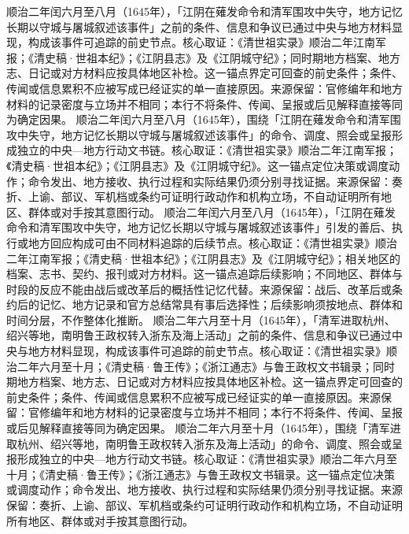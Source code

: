 顺治二年闰六月至八月（1645年），「江阴在薙发命令和清军围攻中失守，地方记忆长期以守城与屠城叙述该事件」之前的条件、信息和争议已通过中央与地方材料显现，构成该事件可追踪的前史节点。核心取证：《清世祖实录》顺治二年江南军报；《清史稿·世祖本纪》；《江阴县志》及《江阴城守纪》；同时期地方档案、地方志、日记或对方材料应按具体地区补检。这一锚点界定可回查的前史条件；条件、传闻或信息累积不应被写成已经证实的单一直接原因。来源保留：官修编年和地方材料的记录密度与立场并不相同；本行不将条件、传闻、呈报或后见解释直接等同为确定因果。
顺治二年闰六月至八月（1645年），围绕「江阴在薙发命令和清军围攻中失守，地方记忆长期以守城与屠城叙述该事件」的命令、调度、照会或呈报形成独立的中央—地方行动文书链。核心取证：《清世祖实录》顺治二年江南军报；《清史稿·世祖本纪》；《江阴县志》及《江阴城守纪》。这一锚点定位决策或调度动作；命令发出、地方接收、执行过程和实际结果仍须分别寻找证据。来源保留：奏折、上谕、部议、军机档或条约可证明行政动作和机构立场，不自动证明所有地区、群体或对手按其意图行动。
顺治二年闰六月至八月（1645年），「江阴在薙发命令和清军围攻中失守，地方记忆长期以守城与屠城叙述该事件」引发的善后、执行或地方回应构成可由不同材料追踪的后续节点。核心取证：《清世祖实录》顺治二年江南军报；《清史稿·世祖本纪》；《江阴县志》及《江阴城守纪》；相关地区的档案、志书、契约、报刊或对方材料。这一锚点追踪后续影响；不同地区、群体与时段的反应不能由战后或改革后的概括性记忆代替。来源保留：战后、改革后或条约后的记忆、地方记录和官方总结常具有事后选择性；后续影响须按地点、群体和时间分层，不作整体化推断。
顺治二年六月至十月（1645年），「清军进取杭州、绍兴等地，南明鲁王政权转入浙东及海上活动」之前的条件、信息和争议已通过中央与地方材料显现，构成该事件可追踪的前史节点。核心取证：《清世祖实录》顺治二年六月至十月；《清史稿·鲁王传》；《浙江通志》与鲁王政权文书辑录；同时期地方档案、地方志、日记或对方材料应按具体地区补检。这一锚点界定可回查的前史条件；条件、传闻或信息累积不应被写成已经证实的单一直接原因。来源保留：官修编年和地方材料的记录密度与立场并不相同；本行不将条件、传闻、呈报或后见解释直接等同为确定因果。
顺治二年六月至十月（1645年），围绕「清军进取杭州、绍兴等地，南明鲁王政权转入浙东及海上活动」的命令、调度、照会或呈报形成独立的中央—地方行动文书链。核心取证：《清世祖实录》顺治二年六月至十月；《清史稿·鲁王传》；《浙江通志》与鲁王政权文书辑录。这一锚点定位决策或调度动作；命令发出、地方接收、执行过程和实际结果仍须分别寻找证据。来源保留：奏折、上谕、部议、军机档或条约可证明行政动作和机构立场，不自动证明所有地区、群体或对手按其意图行动。
